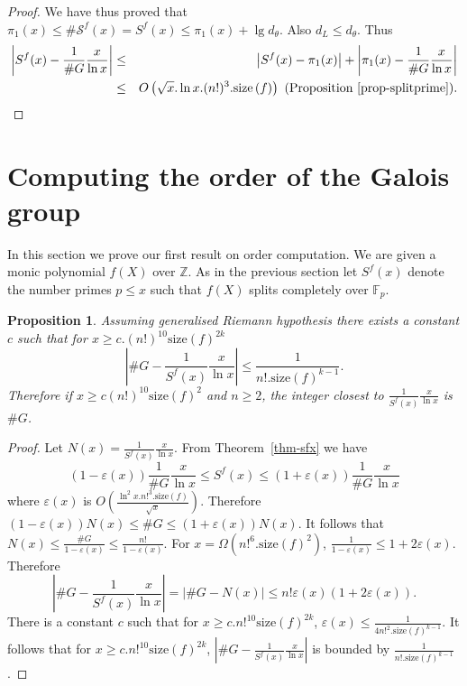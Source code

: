 \documentclass[11pt]{madras}%
\newtheorem{proposition}[theorem]{Proposition}
\theoremstyle{remark}
\newcommand{\size}[1]{{\ensuremath{\mathrm{size}\left(#1\right)}}}
\begin{document}
\begin{proof}
  We have thus proved that $\pi_1(x) \leq \# \mathcal{S}^f(x) = S^f(x)
  \leq \pi_1(x) + \lg{d_\theta}$. Also $d_L \leq d_\theta$. Thus
  \begin{eqnarray*}
    \left| S^f(x) - \frac{1}{\# G}\frac{x}{\ln{x}} \right| &\leq& \left|
      S^f(x) - \pi_1(x) \right| + \left|\pi_1(x) - \frac{1}{\#
        G}\frac{x}{\ln{x}} \right|\\
    & \leq&  O\left( \sqrt{x} .\ln{x}.
      (n!)^3. \size{f}\right) \textrm{ (Proposition~\ref{prop-splitprime})}.
  \end{eqnarray*}
\end{proof}
%



\section{Computing the order of the Galois group}

In this section we prove our first result on order computation. We are
given a monic polynomial $f(X)$ over $\mathbb{Z}$. As in the previous
section let $S^f(x)$ denote the number primes $p \leq x$ such that
$f(X)$ splits completely over $\mathbb{F}_p$.


\begin{proposition}\label{prop-hashg-approx}
  Assuming generalised Riemann hypothesis there exists a constant $c$
  such that for $x \geq c. (n!)^{10} \size{f}^{2k}$
  \[
  \left| \# G - \frac{1}{S^f(x)} \frac{x}{\ln {x}} \right| \leq
  \frac{1}{n!.\size{f}^{k-1}}.
  \]
  Therefore if $x \geq c (n!)^{10} \size{f}^2$ and $n \geq 2$, the
  integer closest to $\frac{1}{S^f(x)} \frac{x}{\ln {x}}$ is $\# G$.
\end{proposition}
\begin{proof}
  Let $N(x) = \frac{1}{S^f(x)}\frac{x}{\ln{x}}$. From
  Theorem~\ref{thm-sfx} we have
  \[ (1 - \varepsilon(x)) \frac{1}{\# G}\frac{x}{\ln{x}} \leq S^f(x)
  \leq (1 + \varepsilon(x)) \frac{1}{\# G}\frac{x}{\ln{x}} \] where
  $\varepsilon(x)$ is
  $O\left(\frac{\ln^2{x}.n!^3.\size{f}}{\sqrt{x}}\right)$. Therefore
  $(1 - \varepsilon(x))N(x) \leq \# G \leq (1 + \varepsilon(x)) N(x)$.
  It follows that $N(x) \leq \frac{\#G}{1 - \varepsilon(x)} \leq
  \frac{n!}{1 - \varepsilon(x)}$. For $x = \Omega(n!^{6}.\size{f}^2)$,
  $\frac{1}{1 - \varepsilon(x)} \leq 1 + 2 \varepsilon(x)$.  Therefore
  \[
  \left|\# G - \frac{1}{S^f(x)}\frac{x}{\ln{x}} \right| = \left|\# G -
    N(x) \right| \leq n!\varepsilon(x)(1 + 2\varepsilon(x)).
  \]
  There is a constant $c$ such that for $x \geq
  c.n!^{10}\size{f}^{2k}$, $\varepsilon(x) \leq
  \frac{1}{4n!^2.\size{f}^{k-1}}$. It follows that for $x \geq
  c.n!^{10}\size{f}^{2k}$, $\left|\# G -
    \frac{1}{S^f(x)}\frac{x}{\ln{x}} \right|$ is bounded by
  $\frac{1}{n!.\size{f}^{k-1}}$.
\end{proof}
\end{document}
